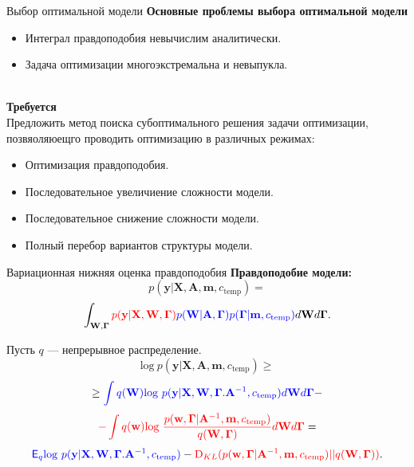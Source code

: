\documentclass[usenames,dvipsnames,11pt,pdf,utf8,russian,aspectratio=169]{beamer}
\begin{document}
\begin{frame}{Выбор оптимальной модели}
\textbf{Основные проблемы выбора оптимальной модели}\\
\begin{itemize}
\item Интеграл правдоподобия невычислим аналитически.
\item Задача оптимизации многоэкстремальна и невыпукла.
\end{itemize}
~\\
\textbf{Требуется}\\ 
Предложить метод поиска субоптимального решения задачи оптимизации, позвяоляюещго проводить оптимизацию в различных режимах:
\begin{itemize}
\item Оптимизация правдоподобия.
\item Последовательное увеличиение сложности модели.
\item Последовательное снижение сложности модели.
\item Полный перебор вариантов структуры модели.
\end{itemize}

\end{frame}                                                                                                                                              
                                                                                                                                    

\begin{frame}{Вариационная нижняя оценка правдоподобия}     
\textbf{Правдоподобие модели:}
\[
p(\mathbf{y}|\mathbf{X},\mathbf{A},\mathbf{m}, c_{\text{temp}}) =
\]
\[
 \int_{\mathbf{W}, \boldsymbol{\Gamma} } \textcolor{red}{p(\mathbf{y}|\mathbf{X},\mathbf{W},  \boldsymbol{\Gamma})} \textcolor{blue}{p(\mathbf{W}|\mathbf{A}, \boldsymbol{\Gamma})p(\boldsymbol{\Gamma}|\mathbf{m}, c_{\text{temp}})} d\mathbf{W}d{\boldsymbol{\Gamma}}.                         
\]

Пусть $q$ --- непрерывное распределение.
$$                                                                                                                                              
        \text{log}~p(\mathbf{y}|\mathbf{X},\mathbf{A},\mathbf{m}, c_{\text{temp}}) \geq 
$$          
$$                                                                                                                                              
         \geq  \textcolor{blue}{\int q(\mathbf{W})\text{log}~{p(\mathbf{y} | \mathbf{X}, \mathbf{W}, \boldsymbol{\Gamma}. \mathbf{A}^{-1}, c_{\text{temp}})}d \mathbf{W}d\boldsymbol{\Gamma}} -$$ 
    $$  \textcolor{red}{-\int q(\mathbf{w})\text{log}~\frac{p(\mathbf{w}, \boldsymbol{\Gamma} |\mathbf{A}^{-1}, \mathbf{m}, c_{\text{temp}})}{q(\mathbf{W}, \boldsymbol{\Gamma})}d\mathbf{W}d\boldsymbol{\Gamma}} =$$
$$
\textcolor{blue}{\mathsf{E}_q \text{log}~{p(\mathbf{y} | \mathbf{X}, \mathbf{W}, \boldsymbol{\Gamma}. \mathbf{A}^{-1}, c_{\text{temp}})}} - \textcolor{red}{\text{D}_{KL}(p(\mathbf{w}, \boldsymbol{\Gamma} |\mathbf{A}^{-1}, \mathbf{m}, c_{\text{temp}}) || q(\mathbf{W}, \boldsymbol{\Gamma}))}.
$$ 

\end{frame}      
   
\end{document}
